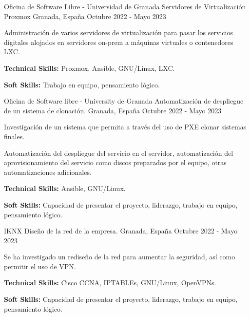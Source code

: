 

\begin{cventries}

\cventry
{Oficina de Software Libre - Universidad de Granada} %
{Servidores de Virtualización Proxmox} %
{Granada, España} %
{Octubre 2022 - Mayo 2023} %
{
  \begin{cvitems} %
    \item {Administración de varios servidores de virtualización para pasar los servicios digitales alojados en servidores on-prem a máquinas virtuales o contenedores LXC.}
    \item {\textbf{Technical Skills:} Proxmox, Ansible, GNU/Linux, LXC.}
    \item {\textbf{Soft Skills:} Trabajo en equipo, pensamiento lógico.}
  \end{cvitems}
}

\cventry
  {Oficina de Software libre - University de Granada} %
  {Automatización de despliegue de un sistema de clonación.} %
  {Granada, España} %
  {Octubre 2022 - Mayo 2023} %
  {
    \begin{cvitems} %
      \item {Investigación de un sistema que permita a través del uso de PXE clonar sistemas finales.}
      \item {Automatización del despliegue del servicio en el servidor, automatización del aprovisionamiento del servicio como discos preparados por el equipo, otras automatizaciones adicionales.}
      \item {\textbf{Technical Skills:} Ansible, GNU/Linux.}
      \item {\textbf{Soft Skills:} Capacidad de presentar el proyecto, liderazgo, trabajo en equipo, pensamiento lógico.}
    \end{cvitems}
  }

\cventry
  {IKNX} %
  {Diseño de la red de la empresa.} %
  {Granada, España} %
  {Octubre 2022 - Mayo 2023} %
  {
    \begin{cvitems} %
      \item {Se ha investigado un rediseño de la red para aumentar la seguridad, así como permitir el uso de VPN.}
      \item {\textbf{Technical Skills:} Cisco CCNA, IPTABLEs, GNU/Linux, OpenVPNs.}
      \item {\textbf{Soft Skills:} Capacidad de presentar el proyecto, liderazgo, trabajo en equipo, pensamiento lógico.}
    \end{cvitems}
  }

\end{cventries}
